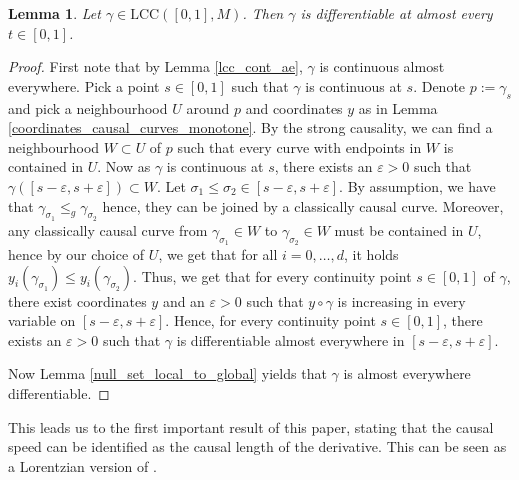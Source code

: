 \documentclass[a4paper,10pt]{article}
\newtheorem{lemma}[theorem]{Lemma}
\numberwithin{equation}{section}
\newcommand{\e}{\varepsilon}
\begin{document}
\begin{lemma}\label{lcc_diff_a-e}
      Let $\gamma \in \mathrm{LCC}([0,1], M)$. Then $\gamma$ is differentiable at almost every $t \in [0,1]$.
\end{lemma}
\begin{proof}
     First note that by Lemma \ref{lcc_cont_ae}, $\gamma$ is continuous almost everywhere. Pick a point $s \in [0,1]$ such that $\gamma$ is continuous at $s$. 
    Denote $p:= \gamma_s$ and pick a neighbourhood $U$ around $p$ and coordinates $y$ as in Lemma \ref{coordinates_causal_curves_monotone}.
    By the strong causality, we can find a neighbourhood $W \subset U$ of $p$ such that every curve with endpoints in $W$ is contained in $U$. 
    Now as $\gamma$ is continuous at $s$, there exists an $\e> 0$ such that $\gamma([s-\e, s+\e]) \subset W$. Let $\sigma_1\leq  \sigma_2 \in [s-\e, s+\e]$. 
    By assumption, we have that $\gamma_{\sigma_1} \leq_g \gamma_{\sigma_2}$ hence, they can be joined by a classically causal curve. Moreover, any classically causal curve from $\gamma_{\sigma_1} \in W$ to $\gamma_{\sigma_2} \in W$ must be contained in $U$, hence by our choice of $U$, we get that for all $i =0, \ldots, d$, it holds $y_i(\gamma_{\sigma_1}) \leq y_i(\gamma_{\sigma_2})$.  
    Thus, we get that for every continuity point $s \in [0,1]$ of $\gamma$, there exist coordinates $y$ and an $\e>0$ such that  $y \circ \gamma$ is increasing in every variable on $[s-\e, s+\e]$. Hence, for every continuity point $s \in [0,1]$, there exists an $\e>0$ such that $\gamma$ is differentiable almost everywhere in $[s-\e, s+\e]$.

    Now Lemma \ref{null_set_local_to_global} yields that $\gamma$ is almost everywhere differentiable.
\end{proof}
This leads us to the first important result of this paper, stating that the causal speed can be identified as the causal length of the derivative. This can be seen as a Lorentzian version of \cite[Corollary 3.8]{burtscher2012length}.
\end{document}
